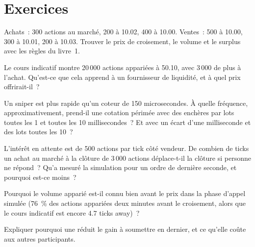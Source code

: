 \section{Exercices}

\begin{exercise}[$\star$]\label{exo:mx:auction-mechanics-and-theory:1}
Achats~: 300 actions au marché, 200 à 10.02, 400 à 10.00. Ventes~: 500 à 10.00, 300 à 10.01, 200 à 10.03. Trouver le prix de croisement, le volume et le
surplus avec les règles du livre~1.
\end{exercise}

\begin{exercise}[$\star$]\label{exo:mx:auction-mechanics-and-theory:2}
Le cours indicatif montre 20\,000 actions appariées à 50.10, avec 3\,000 de plus à l'achat. Qu'est-ce que cela apprend à un fournisseur de liquidité, et à quel prix offrirait-il~?
\end{exercise}

\begin{exercise}[$\star$]\label{exo:mx:auction-mechanics-and-theory:3}
Un sniper est plus rapide qu'un coteur de 150 microsecondes. À quelle fréquence, approximativement, prend-il une cotation périmée avec des enchères par lots toutes les 1 et toutes les 10
millisecondes~? Et avec un écart d'une milliseconde et des lots toutes les 10~?
\end{exercise}

\begin{exercise}[$\star\star$]\label{exo:mx:auction-mechanics-and-theory:4}
L'intérêt en attente est de 500 actions par tick côté vendeur. De combien de ticks un achat au marché à la clôture de 3\,000 actions déplace-t-il la clôture si personne ne répond~? Qu'a
mesuré la simulation pour un ordre de dernière seconde, et pourquoi est-ce moins~?
\end{exercise}

\begin{exercise}[$\star\star$]\label{exo:mx:auction-mechanics-and-theory:5}
Pourquoi le volume apparié est-il connu bien avant le prix dans la phase d'appel simulée (76~\% des actions appariées deux minutes avant le croisement, alors que le cours indicatif est encore
4.7 ticks away)~?
\end{exercise}

\begin{exercise}[$\star\star$]\label{exo:mx:auction-mechanics-and-theory:6}
Expliquer pourquoi une  réduit le gain à soumettre en dernier, et ce qu'elle coûte aux autres participants.
\end{exercise}


